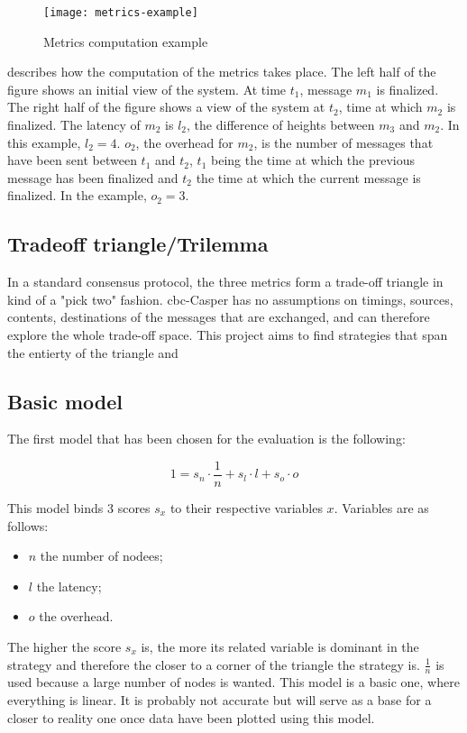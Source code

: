\begin{figure}[h]
	\centering
	\texttt{[image: metrics-example]}
  \captionsetup{justification=centering}
    \caption{Metrics computation example}
	\label{fig:metricsSchema}
\end{figure}

 describes how the computation of the metrics
takes place. The left half of the figure shows an initial view of the system. At
time \(t_1\), message \(m_1\) is finalized. The right half of the figure shows a
view of the system at \(t_2\), time at which \(m_2\) is finalized. The latency
of \(m_2\) is \(l_2\), the difference of heights between \(m_3\) and \(m_2\). In
this example, \(l_2 = 4\). \(o_2\), the overhead for \(m_2\), is the number of
messages that have been sent between \(t_1\) and \(t_2\), \(t_1\) being the time
at which the previous message has been finalized and \(t_2\) the time at which
the current message is finalized. In the example, \(o_2 = 3\).
\FloatBarrier

\subsection{Tradeoff triangle/Trilemma}
In a standard consensus protocol, the three metrics form a trade-off triangle in
kind of a "pick two" fashion.  \gls{cbc}-Casper has no
assumptions on timings, sources, contents, destinations of the messages that are
exchanged, and can therefore explore the whole trade-off space. This project
aims to find strategies that span the entierty of the triangle and 

\subsection{Basic model}
\label{ssec:model}
The first model that has been chosen for the evaluation is the following:

\[1 = s_n \cdot \frac{1}{n} + s_l\cdot l + s_o\cdot o\]

This model binds 3 scores \(s_x\) to their respective variables \(x\).
Variables are as follows:
\begin{itemize}
    \item \(n\) the number of nodees;
    \item \(l\) the latency;
    \item \(o\) the overhead.
\end{itemize}
The higher the score \(s_x\) is, the more its related variable is dominant
in the strategy and therefore the closer to a corner of the triangle the strategy is.
\(\frac{1}{n}\) is used because a large number of nodes is wanted.
This model is a basic one, where everything is linear. It is probably not accurate but
will serve as a base for a closer to reality one once data have been plotted using
this model.

